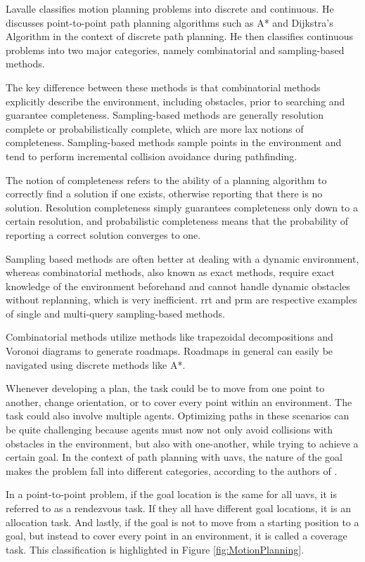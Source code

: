 Lavalle classifies motion planning problems into discrete and continuous. He discusses point-to-point path planning algorithms such as A* and Dijkstra's Algorithm in the context of discrete path planning. He then classifies continuous problems into two major categories, namely combinatorial and sampling-based methods.

The key difference between these methods is that combinatorial methods explicitly describe the environment, including obstacles, prior to searching and guarantee completeness. Sampling-based methods are generally resolution complete or probabilistically complete, which are more lax notions of completeness. Sampling-based methods sample points in the environment and tend to perform incremental collision avoidance during pathfinding. \cite{Lavalle2006}

The notion of completeness refers to the ability of a planning algorithm to correctly find a solution if one exists, otherwise reporting that there is no solution. Resolution completeness simply guarantees completeness only down to a certain resolution, and probabilistic completeness means that the probability of reporting a correct solution converges to one. \cite{Lavalle2006}

Sampling based methods are often better at dealing with a dynamic environment, whereas combinatorial methods, also known as exact methods, require exact knowledge of the environment beforehand and cannot handle dynamic obstacles without replanning, which is very inefficient. \ac{rrt} and \ac{prm} are respective examples of single and multi-query sampling-based methods. 

Combinatorial methods utilize methods like trapezoidal decompositions and Voronoi diagrams to generate roadmaps. Roadmaps in general can easily be navigated using discrete methods like A*. \cite{Lavalle2006}

Whenever developing a plan, the task could be to move from one point to another, change orientation, or to cover every point within an environment. The task could also involve multiple agents. Optimizing paths in these scenarios can be quite challenging because agents must now not only avoid collisions with obstacles in the environment, but also with one-another, while trying to achieve a certain goal. In the context of path planning with \acp{uav}, the nature of the goal makes the problem fall into different categories, according to the authors of \cite{Zhang2020}. 

In a point-to-point problem, if the goal location is the same for all \acp{uav}, it is referred to as a rendezvous task. If they all have different goal locations, it is an allocation task. And lastly, if the goal is not to move from a starting position to a goal, but instead to cover every point in an environment, it is called a coverage task. This classification is highlighted in Figure \ref{fig:MotionPlanning}.

